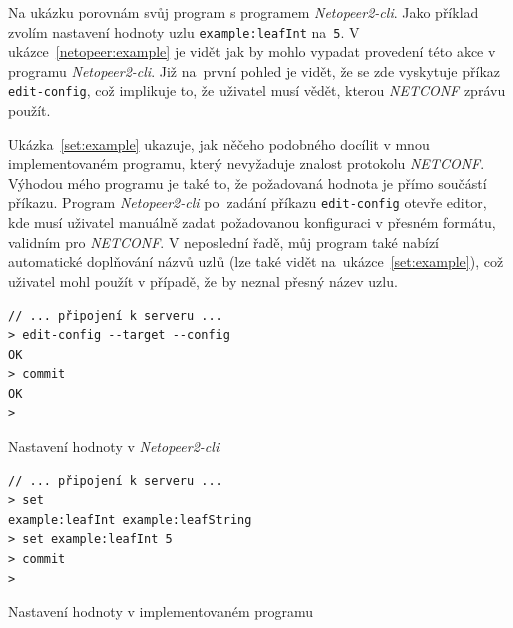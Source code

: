 \documentclass[thesis=B,czech,hidelinks]{FITthesis}[2019/03/06]
\begin{document}
Na ukázku porovnám svůj program s programem \textit{Netopeer2-cli}. Jako příklad zvolím nastavení hodnoty uzlu \texttt{example:leafInt} na~\texttt{5}. V ukázce~\ref{netopeer:example} je vidět jak by mohlo vypadat provedení této akce v programu \textit{Netopeer2-cli}. Již na~první pohled je vidět, že se zde vyskytuje příkaz \texttt{edit-config}, což implikuje to, že uživatel musí vědět, kterou \textit{NETCONF} zprávu použít.

Ukázka~\ref{set:example} ukazuje, jak něčeho podobného docílit v mnou implementovaném programu, který nevyžaduje znalost protokolu \textit{NETCONF}. Výhodou mého programu je také to, že požadovaná hodnota je přímo součástí příkazu. Program \textit{Netopeer2-cli} po~zadání příkazu \texttt{edit-config} otevře editor, kde musí uživatel manuálně zadat požadovanou konfiguraci v přesném formátu, validním pro \textit{NETCONF}. V neposlední řadě, můj program také nabízí automatické doplňování názvů uzlů (lze také vidět na~ukázce~\ref{set:example}), což uživatel mohl použít v případě, že by neznal přesný název uzlu.
\begin{listing}
\begin{verbatim}
// ... připojení k serveru ...
> edit-config --target --config
OK
> commit
OK
>
\end{verbatim}
\caption{Nastavení hodnoty v \textit{Netopeer2-cli}\label{netopeer:example}}
\end{listing}

\begin{listing}
\begin{verbatim}
// ... připojení k serveru ...
> set
example:leafInt example:leafString
> set example:leafInt 5
> commit
>
\end{verbatim}
\caption{Nastavení hodnoty v implementovaném programu}\label{set:example}
\end{listing}
\end{document}
